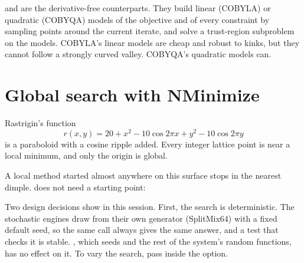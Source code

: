  and  are the derivative-free counterparts.
They build linear (COBYLA) or quadratic (COBYQA) models of the objective and
of every constraint by sampling points around the current iterate, and solve a
trust-region subproblem on the models. COBYLA's linear models are cheap and
robust to kinks, but they cannot follow a strongly curved valley. COBYQA's
quadratic models can.


\section{Global search with NMinimize}
\label{sec:opt-global}

Rastrigin's function
\[
  r(x, y) = 20 + x^2 - 10\cos 2\pi x + y^2 - 10\cos 2\pi y
\]
is a paraboloid with a cosine ripple added. Every integer lattice point is near
a local minimum, and only the origin is global.


A local method started almost anywhere on this surface stops in the nearest
dimple.  does not need a starting point:

\begin{codepairs}
\end{codepairs}

Two design decisions show in this session. First, the search is deterministic.
The stochastic engines draw from their own generator (SplitMix64) with a fixed
default seed, so the same call always gives the same answer, and a test that
checks it is stable. , which seeds  and the rest of
the system's random functions, has no effect on it. To vary the search, pass
 inside the  option.

